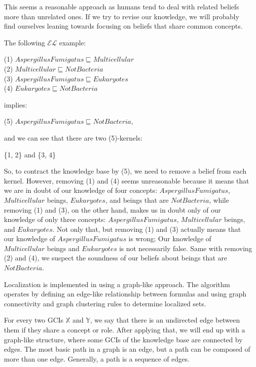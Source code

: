 This seems a reasonable approach as humans tend to deal with related beliefs more than unrelated ones. If we try to revise our knowledge, we will probably find ourselves leaning towards focusing on beliefs that share common concepts. 

The following $\mathcal{EL}$ example:
\begin{center}
(1) $AspergillusFumigatus \sqsubseteq Multicellular $ \\
(2) $Multicellular \sqsubseteq NotBacteria$ \\
(3) $AspergillusFumigatus \sqsubseteq Eukaryotes$ \\
(4) $Eukaryotes \sqsubseteq NotBacteria$ 
\end{center}
implies:
\begin{center}
(5) $AspergillusFumigatus \sqsubseteq NotBacteria$,
\end{center}
and we can see that there are two (5)-kernels:
\begin{center}
\{1, 2\} and \{3, 4\}
\end{center}

So, to contract the knowledge base by (5), we need to remove a belief from each kernel. However, removing (1) and (4) seems unreasonable because it means that we are in doubt of our knowledge of four concepts: $AspergillusFumigatus$, $Multicellular$ beings, $Eukaryotes$, and beings that are $NotBacteria$, while removing (1) and (3), on the other hand, makes us in doubt only of our knowledge of only three concepts: $AspergillusFumigatus$, $Multicellular$ beings, and $Eukaryotes$. Not only that, but removing (1) and (3) actually means that our knowledge of $AspergillusFumigatus$ is wrong; Our knowledge of $Multicellular$ beings and $Eukaryotes$ is not necessarily false. Same with removing (2) and (4), we suspect the soundness of our beliefs about beings that are $NotBacteria$.

Localization is implemented in \cite{zwei} using a graph-like approach. The algorithm operates by defining an edge-like relationship between formulas and using graph connectivity and graph clustering rules to determine localized sets. 

For every two GCIs $\mathbb{X}$ and $\mathbb{Y}$, we say that there is an undirected edge between them if they share a concept or role.
After applying that, we will end up with a graph-like structure, where some GCIs of the knowledge base are connected by edges. The most basic path in a graph is an edge, but a path can be composed of more than one edge. Generally, a path is a sequence of edges.

